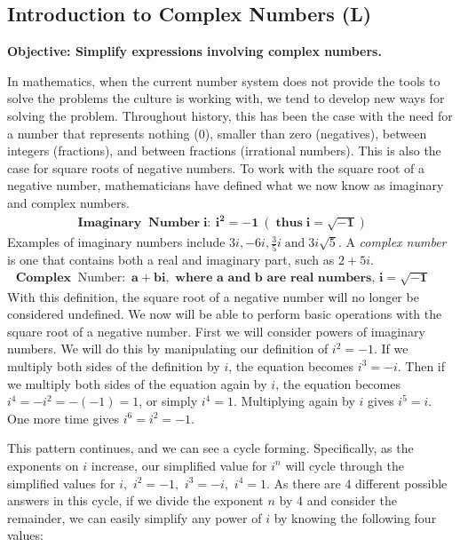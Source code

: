 \documentclass[12pt]{book}
\theoremstyle{definition}
\newcommand{\tmmathbf}[1]{\ensuremath{\boldsymbol{#1}}}
\newcommand{\tmop}[1]{\ensuremath{\operatorname{#1}}}
\begin{document}
\subsection{Introduction to Complex Numbers (L)}
{\bf Objective: Simplify expressions involving complex numbers.}\par
In mathematics, when the current number system does not provide the tools to solve the problems the culture is working with, we tend to develop new ways for solving the problem. Throughout history, this has been the case with the need for a number that represents nothing (0), smaller than zero (negatives), between integers (fractions), and between fractions (irrational numbers). This is also the case for square roots of negative numbers. To work with the square root of a negative number, mathematicians have defined what we now know as imaginary and complex numbers.
\begin{eqnarray*}
  \tmmathbf{\tmop{Imaginary} \tmop{Number} i:~ i^2
  = - 1~ (\tmop{thus} i = \sqrt{- 1})} &  & 
\end{eqnarray*}
Examples of imaginary numbers include $3 i, - 6 i, \frac{3}{5} i \tmop{and} 3
i \sqrt{5}$. A \textit{complex number} is one that contains both a real
and imaginary part, such as $2 + 5 i$.
\begin{eqnarray*}
  \tmmathbf{\tmop{Complex} \tmop{Number:}~ a+bi, \text{~where~} a \text{~and~} b \text{~are~real~numbers,~}  i = \sqrt{- 1}} &  & 
\end{eqnarray*}
With this definition, the square root of a negative number will no longer be considered undefined. We now will be able to perform basic operations with the square root of a negative number. First we will consider powers of imaginary numbers. We will do this by manipulating our definition of $i^2 = - 1$. If we multiply both sides of the definition by $i$, the equation becomes $i^3 = - i$. Then if we multiply both sides of the equation again by $i$, the equation becomes $i^4 = - i^2 = - (- 1) = 1$, or simply $i^4 = 1$. Multiplying again by $i$ gives $i^5
= i$. One more time gives $i^6 = i^2 = - 1$.\par
This pattern continues, and we can see a cycle forming.  Specifically, as the exponents on $i$ increase, our simplified value for $i^n$ will cycle through the simplified values for $i,$ $i^2=- 1,$ $i^3= - i,$ $i^4=1$. As there are 4 different possible answers in this cycle, if we divide the exponent $n$ by 4 and consider the remainder, we can easily simplify any power of $i$ by knowing the following four values:
\end{document}
